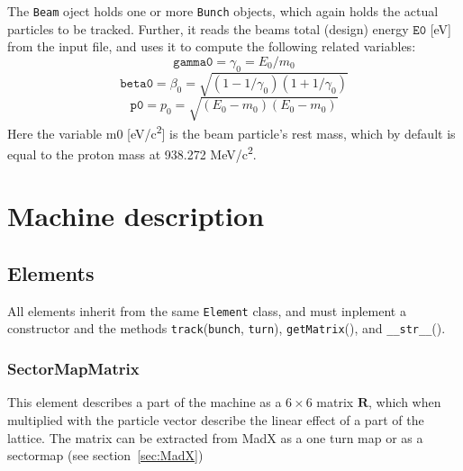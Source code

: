\documentclass[a4paper]{report}
\begin{document}
The \texttt{Beam} oject holds one or more \texttt{Bunch} objects, which again holds the actual particles to be tracked. Further, it reads the beams total (design) energy $\mathtt{E0}$ [eV] from the input file, and uses it to compute the following related variables:
\begin{equation}
  \mathtt{gamma0} = \gamma_0 = E_0/m_0
\end{equation}
\begin{equation}
  \mathtt{beta0} = \beta_0 = \sqrt{\left(1-1/\gamma_0\right) \left(1+1/\gamma_0\right)}
\end{equation}
\begin{equation}
  \mathtt{p0} = p_0 = \sqrt{\left(E_0-m_0\right) \left(E_0-m_0\right)}
  \label{eq:designmomentum}
\end{equation}
Here the variable m0 [eV/c\textsuperscript{2}] is the beam particle's rest mass, which by default is equal to the proton mass at 938.272 MeV/c\textsuperscript{2}.



\chapter{Machine description}
\label{sec:machine}



\section{Elements}
All elements inherit from the same \texttt{Element} class, and must inplement a constructor and the methods \texttt{track}(\texttt{bunch}, \texttt{turn}), \texttt{getMatrix}(), and \texttt{\_\_str\_\_}().

\subsection{SectorMapMatrix}
This element describes a part of the machine as a $6 \times 6$ matrix $\mathbf{R}$, which when multiplied with the particle vector describe the linear effect of a part of the lattice.
The matrix can be extracted from MadX as a one turn map or as a sectormap (see section~\ref{sec:MadX})

\end{document}
